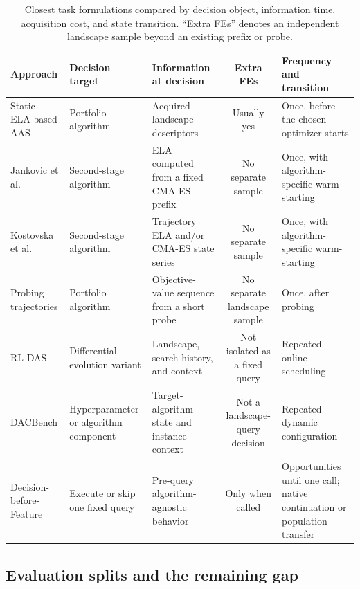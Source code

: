 \begin{table}[t]
\caption{Closest task formulations compared by decision object, information
time, acquisition cost, and state transition. ``Extra FEs'' denotes an
independent landscape sample beyond an existing prefix or probe.}
\label{tab:related-comparison}
\centering
\footnotesize
\begin{tabularx}{\textwidth}{@{}l Y Y c Y@{}}
\toprule
Approach & Decision target & Information at decision & Extra FEs
& Frequency and transition \\
\midrule
Static ELA-based AAS
\cite{kerschkeAutomatedAlgorithmSelection2019,guoAutomatedAlgorithmSelection2025}
& Portfolio algorithm
& Acquired landscape descriptors
& Usually yes
& Once, before the chosen optimizer starts \\
Jankovic et al. \cite{jankovicTrajectorybasedAlgorithmSelection2022}
& Second-stage algorithm
& ELA computed from a fixed CMA-ES prefix
& No separate sample
& Once, with algorithm-specific warm-starting \\
Kostovska et al. \cite{kostovskaPerrunAlgorithmSelection2022}
& Second-stage algorithm
& Trajectory ELA and/or CMA-ES state series
& No separate sample
& Once, with algorithm-specific warm-starting \\
Probing trajectories \cite{renauUtilityProbingTrajectories2024,renauAlgorithmSelectionProbing2025b}
& Portfolio algorithm
& Objective-value sequence from a short probe
& No separate landscape sample
& Once, after probing \\
RL-DAS \cite{guoDeepReinforcementLearning2024b}
& Differential-evolution variant
& Landscape, search history, and context
& Not isolated as a fixed query
& Repeated online scheduling \\
DACBench \cite{eimerDACBenchBenchmarkLibrary2021}
& Hyperparameter or algorithm component
& Target-algorithm state and instance context
& Not a landscape-query decision
& Repeated dynamic configuration \\
Decision-before-Feature
& Execute or skip one fixed query
& Pre-query algorithm-agnostic behavior
& Only when called
& Opportunities until one call; native continuation or population transfer \\
\bottomrule
\end{tabularx}
\end{table}

\subsection{Evaluation splits and the remaining gap}

